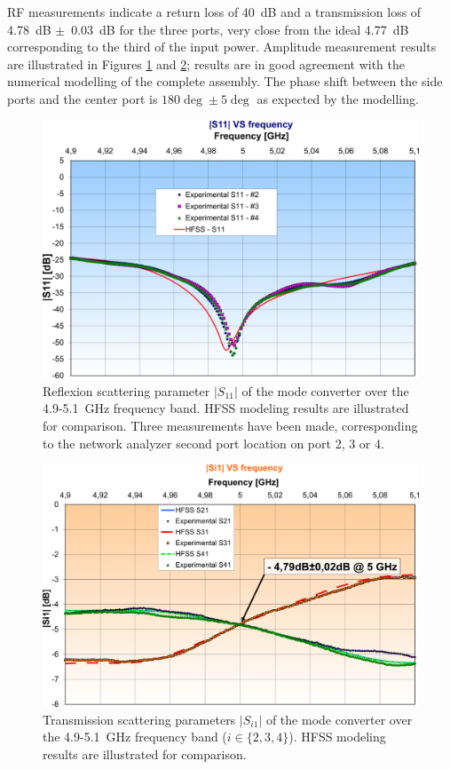 {RF measurements indicate a return loss of 40~dB and a transmission loss of 4.78~dB $\pm$~0.03~dB for the three ports, very close from the ideal 4.77~dB corresponding to the third of the input power. Amplitude measurement results are illustrated in Figures \ref{fig:ModeConverter_S11} and \ref{fig:ModeConverter_S21}; results are in good agreement with the numerical modelling of the complete assembly. The phase shift between the side ports and the center port is $180\deg\pm5\deg$ as expected by the modelling. 

\begin{figure}
	\centering
	\includegraphics[width=1.0\textwidth]{figures/chap3/ITER_modeconverter/LH4ITER_ModeConverter_S11}
	\caption{Reflexion scattering parameter $|S_{11}|$ of the mode converter over the 4.9-5.1~GHz frequency band. HFSS modeling results are illustrated for comparison. Three measurements have been made, corresponding to the network analyzer second port location on port 2, 3 or 4.}
	\label{fig:ModeConverter_S11}
\end{figure}

\begin{figure}
	\centering
	\includegraphics[width=1.0\textwidth]{figures/chap3/ITER_modeconverter/LH4ITER_ModeConverter_S21}
	\caption{Transmission scattering parameters $|S_{i1}|$ of the mode converter over the 4.9-5.1~GHz frequency band ($i \in \{2,3,4\}$). HFSS modeling results are illustrated for comparison.}
	\label{fig:ModeConverter_S21}
\end{figure}

}
